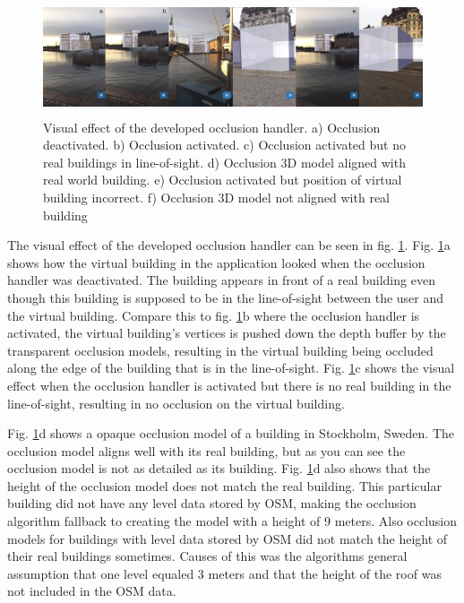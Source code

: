 \begin{figure}
\includegraphics[width=490px, height=129px]{_image_visual-effect}
\caption{Visual effect of the developed occlusion handler. a) Occlusion deactivated. b) Occlusion activated. c) Occlusion activated but no real buildings in line-of-sight. d) Occlusion 3D model aligned with real world building. e) Occlusion activated but position of virtual building incorrect. f) Occlusion 3D model not aligned with real building}
\label{fig:_image_visual-effect}
\end{figure}

The visual effect of the developed occlusion handler can be seen in fig. \ref{fig:_image_visual-effect}. Fig. \ref{fig:_image_visual-effect}a shows how the virtual building in the application looked when the occlusion handler was deactivated. The building appears in front of a real building even though this building is supposed to be in the line-of-sight between the user and the virtual building. Compare this to fig. \ref{fig:_image_visual-effect}b where the occlusion handler is activated, the virtual building's vertices is pushed down the depth buffer by the transparent occlusion models, resulting in the virtual building being occluded along the edge of the building that is in the line-of-sight.  Fig. \ref{fig:_image_visual-effect}c shows the visual effect when the occlusion handler is activated but there is no real building in the line-of-sight, resulting in no occlusion on the virtual building.

Fig. \ref{fig:_image_visual-effect}d shows a opaque occlusion model of a building in Stockholm, Sweden. The occlusion model aligns well with its real building, but as you can see the occlusion model is not as detailed as its building. Fig. \ref{fig:_image_visual-effect}d also shows that the height of the occlusion model does not match the real building. This particular building did not have any level data stored by OSM, making the occlusion algorithm fallback to creating the model with a height of 9 meters. Also occlusion models for buildings with level data stored by OSM did not match the height of their real buildings sometimes. Causes of this was the algorithms general assumption that one level equaled 3 meters and that the height of the roof was not included in the OSM data.

